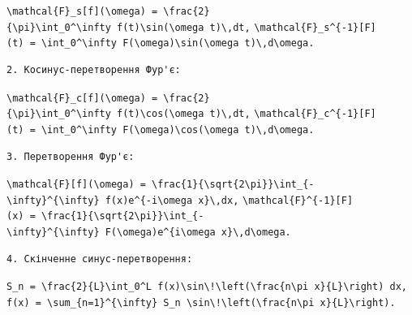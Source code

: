 \documentclass[
  ukrainian,
]{article}
\begin{document}
\texttt{\textbackslash{}mathcal\{F\}\_s{[}f{]}(\textbackslash{}omega)\ =\ \textbackslash{}frac\{2\}\{\textbackslash{}pi\}\textbackslash{}int\_0\^{}\textbackslash{}infty\ f(t)\textbackslash{}sin(\textbackslash{}omega\ t)\textbackslash{},dt,}
\texttt{\textbackslash{}mathcal\{F\}\_s\^{}\{-1\}{[}F{]}(t)\ =\ \textbackslash{}int\_0\^{}\textbackslash{}infty\ F(\textbackslash{}omega)\textbackslash{}sin(\textbackslash{}omega\ t)\textbackslash{},d\textbackslash{}omega.}

\begin{verbatim}
2. Косинус-перетворення Фур'є:
\end{verbatim}

\texttt{\textbackslash{}mathcal\{F\}\_c{[}f{]}(\textbackslash{}omega)\ =\ \textbackslash{}frac\{2\}\{\textbackslash{}pi\}\textbackslash{}int\_0\^{}\textbackslash{}infty\ f(t)\textbackslash{}cos(\textbackslash{}omega\ t)\textbackslash{},dt,}
\texttt{\textbackslash{}mathcal\{F\}\_c\^{}\{-1\}{[}F{]}(t)\ =\ \textbackslash{}int\_0\^{}\textbackslash{}infty\ F(\textbackslash{}omega)\textbackslash{}cos(\textbackslash{}omega\ t)\textbackslash{},d\textbackslash{}omega.}

\begin{verbatim}
3. Перетворення Фур'є:
\end{verbatim}

\texttt{\textbackslash{}mathcal\{F\}{[}f{]}(\textbackslash{}omega)\ =\ \textbackslash{}frac\{1\}\{\textbackslash{}sqrt\{2\textbackslash{}pi\}\}\textbackslash{}int\_\{-\textbackslash{}infty\}\^{}\{\textbackslash{}infty\}\ f(x)e\^{}\{-i\textbackslash{}omega\ x\}\textbackslash{},dx,}
\texttt{\textbackslash{}mathcal\{F\}\^{}\{-1\}{[}F{]}(x)\ =\ \textbackslash{}frac\{1\}\{\textbackslash{}sqrt\{2\textbackslash{}pi\}\}\textbackslash{}int\_\{-\textbackslash{}infty\}\^{}\{\textbackslash{}infty\}\ F(\textbackslash{}omega)e\^{}\{i\textbackslash{}omega\ x\}\textbackslash{},d\textbackslash{}omega.}

\begin{verbatim}
4. Скінченне синус-перетворення:
\end{verbatim}

\texttt{S\_n\ =\ \textbackslash{}frac\{2\}\{L\}\textbackslash{}int\_0\^{}L\ f(x)\textbackslash{}sin\textbackslash{}!\textbackslash{}left(\textbackslash{}frac\{n\textbackslash{}pi\ x\}\{L\}\textbackslash{}right)\ dx,}
\texttt{f(x)\ =\ \textbackslash{}sum\_\{n=1\}\^{}\{\textbackslash{}infty\}\ S\_n\ \textbackslash{}sin\textbackslash{}!\textbackslash{}left(\textbackslash{}frac\{n\textbackslash{}pi\ x\}\{L\}\textbackslash{}right).}
\end{document}

